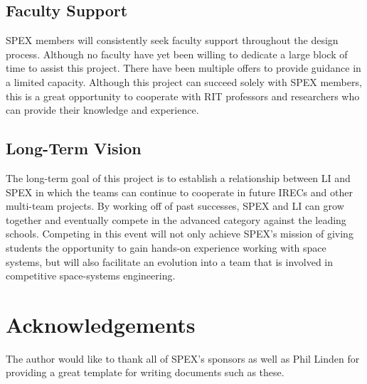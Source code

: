 \documentclass[conference]{IEEEtran} %
\begin{document}
\subsection{Faculty Support}
\label{subsec:Faculty Support}
SPEX members will consistently seek faculty support throughout the design process. Although no faculty have yet been willing to dedicate a
large block of time to assist this project. There have been multiple offers to provide guidance in a limited capacity. Although this project can succeed solely
with SPEX members, this is a great opportunity to cooperate with RIT professors and researchers who can provide their knowledge and experience.

\subsection{Long-Term Vision}
\label{sec:Long-Term Vision}
The long-term goal of this project is to establish a relationship between LI and SPEX in which the teams can continue to cooperate
in future IRECs and other multi-team projects. By working off of past successes, SPEX and LI can grow together and eventually compete in the
advanced category against the leading schools. Competing in this event will not only achieve SPEX's mission of giving students the opportunity to gain hands-on
experience working with space systems, but will also facilitate an evolution into a team that is involved in competitive space-systems engineering.

\section*{Acknowledgements}
\label{subsec:Acknoledgements}
The author would like to thank all of SPEX's sponsors as well as Phil Linden for providing a great template for writing documents such as these.
\onecolumn
\appendices{}
\end{document}
